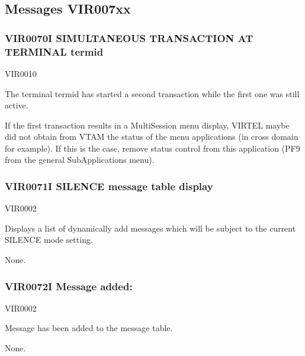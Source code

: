 \documentclass[letterpaper,10pt,english]{sphinxmanual}
\begin{document}
\subsection{Messages VIR007xx}
\label{\detokenize{messages:messages-vir007xx}}

\subsubsection{VIR0070I SIMULTANEOUS TRANSACTION AT TERMINAL termid}
\label{\detokenize{messages:vir0070i-simultaneous-transaction-at-terminal-termid}}\begin{description}
\sphinxAtStartPar
VIR0010

\sphinxAtStartPar
The terminal termid has started a second transaction while the first one was still active.

\sphinxAtStartPar
If the first transaction results in a Multi\sphinxhyphen{}Session menu display, VIRTEL maybe did not obtain from VTAM the status of the menu applications (in cross domain for example). If this is the case, remove status control from this application (PF9 from the general Sub\sphinxhyphen{}Applications menu).

\end{description}


\subsubsection{VIR0071I SILENCE message table display}
\label{\detokenize{messages:vir0071i-silence-message-table-display}}\begin{description}
\sphinxAtStartPar
VIR0002

\sphinxAtStartPar
Displays a list of dynamically add messages which will be subject to the current SILENCE mode setting.

\sphinxAtStartPar
None.

\end{description}


\subsubsection{VIR0072I Message added: }
\label{\detokenize{messages:vir0072i-message-added-messageid}}\begin{description}
\sphinxAtStartPar
VIR0002

\sphinxAtStartPar
Message  has been added to the message table.

\sphinxAtStartPar
None.

\end{description}
\end{document}
